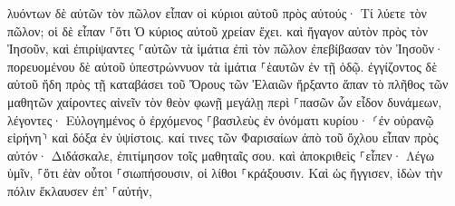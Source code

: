 \documentclass{openreader}
\begin{document}
λυόντων δὲ αὐτῶν τὸν πῶλον εἶπαν οἱ κύριοι αὐτοῦ πρὸς αὐτούς· Τί λύετε τὸν πῶλον; 
οἱ δὲ εἶπαν ⸀ὅτι Ὁ κύριος αὐτοῦ χρείαν ἔχει. 
καὶ ἤγαγον αὐτὸν πρὸς τὸν Ἰησοῦν, καὶ ἐπιρίψαντες ⸀αὐτῶν τὰ ἱμάτια ἐπὶ τὸν πῶλον ἐπεβίβασαν τὸν Ἰησοῦν· 
πορευομένου δὲ αὐτοῦ ὑπεστρώννυον τὰ ἱμάτια ⸀ἑαυτῶν ἐν τῇ ὁδῷ. 
ἐγγίζοντος δὲ αὐτοῦ ἤδη πρὸς τῇ καταβάσει τοῦ Ὄρους τῶν Ἐλαιῶν ἤρξαντο ἅπαν τὸ πλῆθος τῶν μαθητῶν χαίροντες αἰνεῖν τὸν θεὸν φωνῇ μεγάλῃ περὶ ⸀πασῶν ὧν εἶδον δυνάμεων, 
λέγοντες· Εὐλογημένος ὁ ἐρχόμενος ⸀βασιλεὺς ἐν ὀνόματι κυρίου· ⸂ἐν οὐρανῷ εἰρήνη⸃ καὶ δόξα ἐν ὑψίστοις. 
καί τινες τῶν Φαρισαίων ἀπὸ τοῦ ὄχλου εἶπαν πρὸς αὐτόν· Διδάσκαλε, ἐπιτίμησον τοῖς μαθηταῖς σου. 
καὶ ἀποκριθεὶς ⸀εἶπεν· Λέγω ὑμῖν, ⸀ὅτι ἐὰν οὗτοι ⸀σιωπήσουσιν, οἱ λίθοι ⸀κράξουσιν. 
Καὶ ὡς ἤγγισεν, ἰδὼν τὴν πόλιν ἔκλαυσεν ἐπ’ ⸀αὐτήν, 
\end{document}
